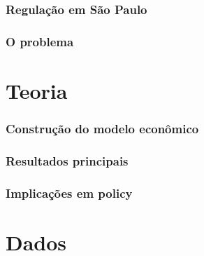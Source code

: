 \documentclass[%
    9pt, 
    aspectratio=169,
]{beamer}
\begin{document}
\begin{frame}
    \frametitle{Regulação em São Paulo}
\end{frame}

\begin{frame}
    \frametitle{O problema}
\end{frame}

\section{Teoria}

\begin{frame}
    \frametitle{Construção do modelo econômico}
\end{frame}

\begin{frame}
    \frametitle{Resultados principais}
\end{frame}

\begin{frame}
    \frametitle{Implicações em policy}
\end{frame}


\section{Dados}
\end{document}
